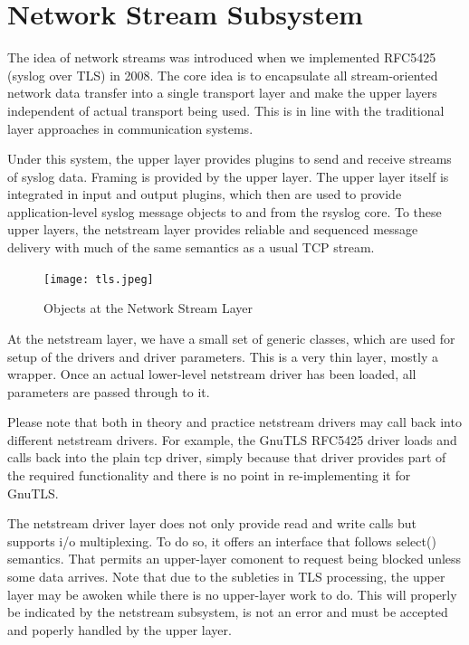 \documentclass[a4paper,10pt]{article}
\begin{document}
\section{Network Stream Subsystem}
The idea of network streams was introduced when we implemented RFC5425 (syslog
over TLS) in 2008. The core idea is to encapsulate all stream-oriented network
data transfer into a single transport layer and make the upper layers
independent of actual transport being used. This is in line with the traditional
layer approaches in communication systems.

Under this system, the upper layer provides plugins to send and receive streams
of syslog data. Framing is provided by the upper layer. The upper layer itself
is integrated in input and output plugins, which then are used to provide
application-level syslog message objects to and from the rsyslog core. To these
upper layers, the netstream layer provides reliable and sequenced message
delivery with much of the same semantics as a usual TCP stream.


\begin{figure}
\begin{center}
\texttt{[image: tls.jpeg]}
\end{center}
\caption{Objects at the Network Stream Layer}
\label{fig_netstream_objects}
\end{figure}

At the netstream layer, we have a small set of generic classes, which are used for setup of the drivers and driver parameters. This is a very thin layer, mostly a wrapper. Once an actual lower-level netstream driver has been loaded, all parameters are passed through to it.

Please note that both in theory and practice netstream drivers may call back into different netstream drivers. For example, the GnuTLS RFC5425 driver loads and calls back into the plain tcp driver, simply because that driver provides part of the required functionality and there  is no point in re-implementing it for GnuTLS.

The netstream driver layer does not only provide read and write calls but supports i/o multiplexing. To do so, it offers an interface that follows select() semantics. That permits an upper-layer comonent to request being blocked unless some data arrives. Note that due to the subleties in TLS processing, the upper layer may be awoken while there is no upper-layer work to do. This will properly be indicated by the netstream subsystem, is not an error and must be accepted and poperly handled by the upper layer.
\end{document}
